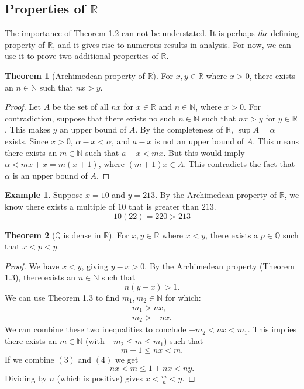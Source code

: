 \documentclass{article}
\newcommand{\N}{\mathbb{N}}
\newcommand{\R}{\mathbb{R}}
\newcommand{\Q}{\mathbb{Q}}
\theoremstyle{definition}
\newtheorem{theorem}{Theorem}[section]
\newtheorem{example}{Example}[section]
\begin{document}
	\subsection{Properties of $ \R $}
	The importance of Theorem 1.2 can not be understated. It is perhaps \textit{the} defining property of $ \R $, and it gives rise to numerous results in analysis. For now, we can use it to prove two additional properties of $ \R $.
	\begin{theorem}[Archimedean property of $ \R $]
		For $ x,y\in \R $ where $ x>0 $, there exists an $ n\in\N $ such that $ nx>y $.
	\end{theorem}   
	\begin{proof}
		Let $ A $ be the set of all $ nx $ for $ x\in\R $ and $ n\in\N $, where $ x>0 $. For contradiction, suppose that there exists no such $ n\in\N $ such that $ nx>y $ for $ y\in\R $. This makes $ y $ an upper bound of $ A $. By the completeness of $ \R $, $ \sup A=\alpha $ exists. Since $ x>0 $, $ \alpha-x<\alpha $, and $ a-x $ is not an upper bound of $ A $. This means there exists an $ m\in\N $ such that $ a-x<mx $. But this would imply $ \alpha<mx+x=m(x+1) $, where $ (m+1)x\in A $. This contradicts the fact that $ \alpha $ is an upper bound of $ A $. 
	\end{proof}
	\begin{example}
		Suppose $ x=10 $ and $ y=213 $. By the Archimedean property of $ \R $, we know there exists a multiple of $ 10 $ that is greater than $ 213 $. $$ 10(22)=220>213$$  
	\end{example}
	\begin{theorem}[$ \Q $ is dense in $ \R $]
		For $ x,y\in \R $ where $ x<y $, there exists a $ p\in\Q $ such that $ x<p<y $. 
	\end{theorem}  
	\begin{proof}
		We have $ x<y $, giving $ y-x>0 $. By the Archimedean property (Theorem 1.3), there exists an $ n\in\N $ such that 
		\begin{equation}
			n(y-x)>1.
		\end{equation}
		We can use Theorem 1.3 to find $ m_1,m_2\in\N $ for which:
		\begin{align*}
			m_1>nx,\\m_2>-nx.
		\end{align*}
		We can combine these two inequalities to conclude $ -m_2<nx<m_1 $. This implies there exists an $ m\in\N $ (with $ -m_2\le m\le m_1 $) such that \begin{equation}
			m-1\le nx<m.
		\end{equation}  
		If we combine $ (3) $ and $ (4) $ we get $$ nx<m\le 1+nx<ny.$$ Dividing by $ n $ (which is positive) gives $ x<\frac{m}{n}<y$. 
	\end{proof}
\end{document}
